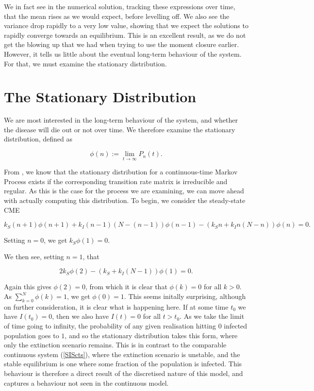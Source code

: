\documentclass[12pt,a4paper,openany,twoside]{book}
\begin{document}
We in fact see in the numerical solution, tracking these expressions over time, that the mean rises as we would expect, before levelling off. We also see the variance drop rapidly to a very low value, showing that we expect the solutions to rapidly converge towards an equilibrium. This is an excellent result, as we do not get the blowing up that we had when trying to use the moment closure earlier. However, it tells us little about the eventual long-term behaviour of the system. For that, we must examine the stationary distribution.

\section{The Stationary Distribution}

We are most interested in the long-term behaviour of the system, and whether the disease will die out or not over time. We therefore examine the stationary distribution, defined as

\begin{equation}
	\phi(n) := \lim_{t \rightarrow \infty} P_n(t).
\end{equation}

From \citet{pollettProblemEstablishingExistence1993}, we know that the stationary distribution for a continuous-time Markov Process exists if the corresponding transition rate matrix is irreducible and regular. As this is the case for the process we are examining, we can move ahead with actually computing this distribution.
To begin, we consider the steady-state CME

\begin{equation}
	k_S (n+1) \phi(n+1) + k_I (n-1) (N-(n-1)) \phi(n-1) - (k_S n + k_I n (N-n)) \phi(n) = 0.
\end{equation}

Setting $n=0$, we get $k_S \phi(1) = 0$.

We then see, setting $n=1$, that

\begin{equation}
	2 k_S \phi(2) - (k_S + k_I(N-1)) \phi(1) = 0.
\end{equation}

Again this gives $\phi(2) = 0$, from which it is clear that $\phi(k) = 0$ for all $k > 0$. As $\sum_{k=0}^N \phi(k) = 1$, we get $\phi(0) = 1$. This seems initally surprising, although on further consideration, it is clear what is happening here. If at some time $t_0$ we have $I(t_0) = 0$, then we also have $I(t) = 0$ for all $t > t_0$. As we take the limit of time going to infinity, the probability of any given realisation hitting $0$ infected population goes to $1$, and so the stationary distribution takes this form, where only the extinction scenario remains. This is in contrast to the comparable continuous system (\ref{SIScts}), where the extinction scenario is unstable, and the stable equilibrium is one where some fraction of the population is infected. This behaviour is therefore a direct result of the discretised nature of this model, and captures a behaviour not seen in the continuous model.
\end{document}
